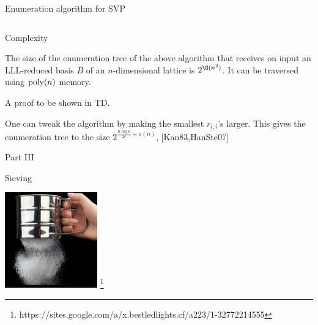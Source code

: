 \documentclass[usenames,dvipsnames, 9pt, aspectratio=169]{beamer}
\newcommand\blfootnote[1]{%
	\begingroup
	\renewcommand\footnoterule{}
	\renewcommand\thefootnote{}\footnote{#1}%
	\addtocounter{footnote}{-1}%
	\endgroup
}
\begin{document}
\begin{frame}{Enumeration algorithm for SVP}
\begin{columns}[t]
\end{columns}

\end{frame}

\begin{frame}{Complexity}
	\Large
	\begin{theorem} The size of the enumeration tree of the above algorithm that receives on input an LLL-reduced basis $B$ of an $n$-dimensional lattice	is $2^{\O(n^2)}$. It can be traversed using $\mathrm{poly}(n)$ memory.
	\end{theorem}

A proof to be shown in TD.

\vspace{15pt}

One can tweak the algorithm by making the smallest $r_{i,i}$'s larger. This gives the enumeration tree to the size $2^{\frac{n \log n}{2e}+o(n)}$, {\color{Orange}[Kan83,HanSte07] }


\end{frame}


\begin{frame}
	\renewcommand\footnoterule{}
	Part III \\ [10pt]
	\begin{center}
		\color{Orange} \Huge{Sieving}
		
		\vspace{20pt}
		
		\includegraphics[width=4.0cm]{siever.jpg}
		\blfootnote{{\color{gray}https://sites.google.com/a/x.bestledlights.cf/a223/1-32772214555}}
	\end{center}
	
\end{frame}

\end{document}
